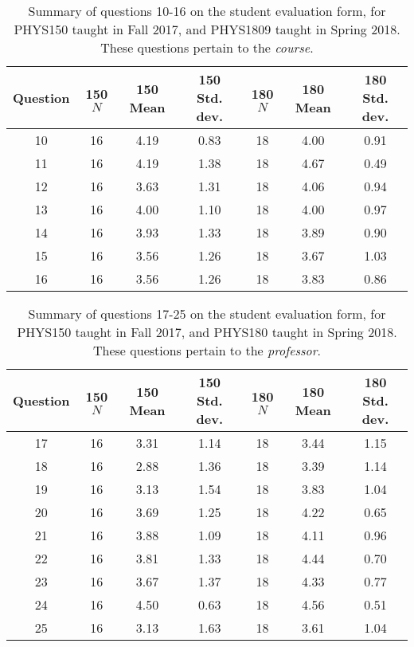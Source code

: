 \documentclass[../../main.tex]{subfiles}
\begin{document}
\begin{table}
\small
\centering
\begin{tabular}{| c | c | c | c | c | c | c |}
\hline \hline
Question & 150 $N$ & 150 Mean & 150 Std. dev. & 180 $N$ & 180 Mean & 180 Std. dev. \\ \hline
10 & 16 & 4.19 & 0.83 & 18 & 4.00 & 0.91 \\ \hline
11 & 16 & 4.19 & 1.38 & 18 & 4.67 & 0.49 \\ \hline
12 & 16 & 3.63 & 1.31 & 18 & 4.06 & 0.94 \\ \hline
13 & 16 & 4.00 & 1.10 & 18 & 4.00 & 0.97 \\ \hline
14 & 16 & 3.93 & 1.33 & 18 & 3.89 & 0.90 \\ \hline
15 & 16 & 3.56 & 1.26 & 18 & 3.67 & 1.03 \\ \hline
16 & 16 & 3.56 & 1.26 & 18 & 3.83 & 0.86 \\ \hline
\hline
\end{tabular}
\caption{\label{tab:courses:intro_eval_3} Summary of questions 10-16 on the student evaluation form, for PHYS150 taught in Fall 2017, and PHYS1809 taught in Spring 2018.  These questions pertain to the \textit{course}.}
\end{table}

\begin{table}
\small
\centering
\begin{tabular}{| c | c | c | c | c | c | c |}
\hline \hline
Question & 150 $N$ & 150 Mean & 150 Std. dev. & 180 $N$ & 180 Mean & 180 Std. dev. \\ \hline
17 & 16 & 3.31 & 1.14 & 18 & 3.44 & 1.15 \\ \hline
18 & 16 & 2.88 & 1.36 & 18 & 3.39 & 1.14 \\ \hline
19 & 16 & 3.13 & 1.54 & 18 & 3.83 & 1.04 \\ \hline
20 & 16 & 3.69 & 1.25 & 18 & 4.22 & 0.65 \\ \hline
21 & 16 & 3.88 & 1.09 & 18 & 4.11 & 0.96 \\ \hline
22 & 16 & 3.81 & 1.33 & 18 & 4.44 & 0.70 \\ \hline
23 & 16 & 3.67 & 1.37 & 18 & 4.33 & 0.77 \\ \hline
24 & 16 & 4.50 & 0.63 & 18 & 4.56 & 0.51 \\ \hline
25 & 16 & 3.13 & 1.63 & 18 & 3.61 & 1.04 \\ \hline
\hline
\end{tabular}
\caption{\label{tab:courses:intro_eval_4} Summary of questions 17-25 on the student evaluation form, for PHYS150 taught in Fall 2017, and PHYS180 taught in Spring 2018.  These questions pertain to the \textit{professor}.}
\end{table}
\end{document}
